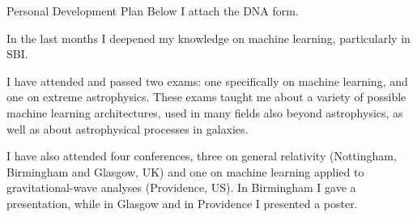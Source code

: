 \documentclass[11pt,a4paper,oneside]{book}
\numberwithin{equation}{chapter}
\numberwithin{table}{chapter}
\numberwithin{figure}{chapter}
\begin{document}
\begin{chapter}{Personal Development Plan}
Below I attach the DNA form. 

In the last months I deepened my knowledge on machine learning, particularly in SBI.

I have attended and passed two exams: one specifically on machine learning, and one on extreme astrophysics.
These exams taught me about a variety of possible machine learning architectures, used in many fields also beyond astrophysics, as well as about astrophysical processes in galaxies.

I have also attended four conferences, three on general relativity (Nottingham, Birmingham and Glasgow, UK) and one on machine learning applied to gravitational-wave analyses (Providence, US). 
In Birmingham I gave a presentation, while in Glasgow and in Providence I presented a poster.

\end{chapter}

\appendix
%
%
%



% 
 
\end{document}
